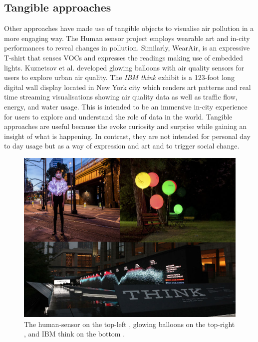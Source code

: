 \subsection{Tangible approaches}
Other approaches have made use of tangible objects to visualise air pollution in a more engaging way. The Human sensor project \cite{InvisibleDust2016} employs wearable art and in-city performances to reveal changes in pollution. Similarly, WearAir, \cite{Kim2010} is an expressive T-shirt that senses VOCs and expresses the readings making use of embedded lights. Kuznetsov et al. \cite{Kuznetsov2011} developed glowing balloons with air quality sensors for users to explore urban air quality. The \textit{IBM think} exhibit \cite{IBM2012} is a 123-foot long digital wall display located in New York city which renders art patterns and real time streaming visualisations showing air quality data as well as traffic flow, energy, and water usage. This is intended to be an immersive in-city experience for users to explore and understand the role of data in the world. Tangible approaches are useful because the evoke curiosity and surprise while gaining an insight of what is happening. In contrast, they are not intended for personal day to day usage but as a way of expression and art and to trigger social change. 

\begin{figure}[H]
\begin{adjustbox}{width=.8\textwidth,center=\textwidth}
  \centering
  \includegraphics[scale=.4]{images/think_human_sensor_balloons.jpg}
\end{adjustbox}
  \caption[Tangible visualizations]{The human-sensor on the top-left \cite{InvisibleDust2016}, glowing balloons on the top-right \cite{Kuznetsov2011}, and IBM think on the bottom \cite{IBM2012}.}
  \label{fig:photo_based_instaNO2}
\end{figure}

